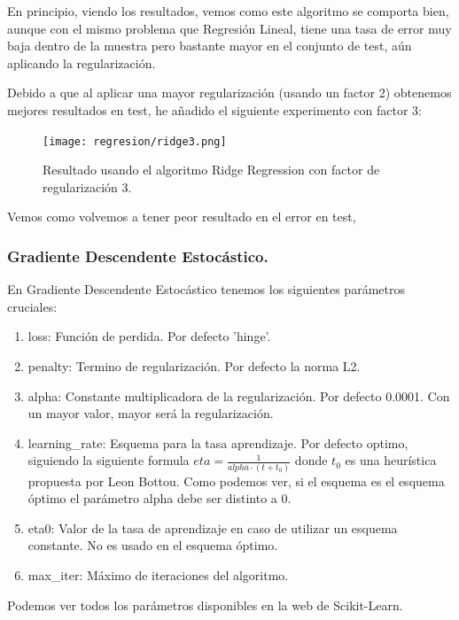 \documentclass[12pt, spanish]{article}
\begin{document}
En principio, viendo los resultados, vemos como este algoritmo se comporta bien, aunque con el mismo problema que Regresión Lineal, tiene una tasa de error muy baja dentro de la muestra pero bastante mayor en el conjunto de test, aún aplicando la regularización.

Debido a que al aplicar una mayor regularización (usando un factor 2) obtenemos mejores resultados en test, he añadido el siguiente experimento con factor 3:


\begin{figure}[H]
	\centering
	\texttt{[image: regresion/ridge3.png]}
	\caption{Resultado usando el algoritmo Ridge Regression con factor de regularización 3.}
	\label{ridgereg3}
\end{figure}


Vemos como volvemos a tener peor resultado en el error en test, 

\newpage

\subsubsection{Gradiente Descendente Estocástico.}

En Gradiente Descendente Estocástico tenemos los siguientes parámetros cruciales:

\begin{enumerate}
	\item loss: Función de perdida. Por defecto 'hinge'.
	\item penalty: Termino de regularización. Por defecto la norma L2.
	\item alpha: Constante multiplicadora de la regularización. Por defecto 0.0001. Con un mayor valor, mayor será la regularización.
	\item learning\_rate: Esquema para la tasa aprendizaje. Por defecto optimo, siguiendo la siguiente formula $eta = \frac{1}{alpha \cdot (t + t_0)}$ donde $t_0$ es una heurística propuesta por Leon Bottou. Como podemos ver, si el esquema es el esquema óptimo el parámetro alpha debe ser distinto a 0.
	\item eta0: Valor de la tasa de aprendizaje en caso de utilizar un esquema constante. No es usado en el esquema óptimo.
	\item max\_iter: Máximo de iteraciones del algoritmo.
\end{enumerate}

Podemos ver todos los parámetros disponibles en la web de Scikit-Learn\cite{sgdclasificacion}.
\end{document}
